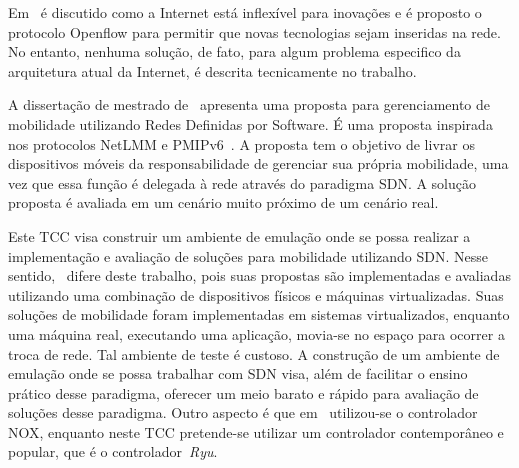 \documentclass[	12pt, Times, openright, twoside, a4paper, english, brazil]{abntex2}
\begin{document}
Em~\cite{McKeown} é discutido como a Internet está inflexível para inovações e é proposto o protocolo Openflow para permitir que novas tecnologias sejam inseridas na rede. No entanto, nenhuma solução, de fato, para algum problema especifico da arquitetura atual da Internet, é descrita tecnicamente no trabalho. 


A dissertação de mestrado de~ apresenta uma proposta para gerenciamento de mobilidade utilizando Redes Definidas por Software. É uma proposta inspirada nos protocolos NetLMM e PMIPv6~\cite{RFC5213}. A proposta tem o objetivo de livrar os dispositivos móveis da responsabilidade de gerenciar sua própria mobilidade, uma vez que essa função é delegada à rede através do paradigma SDN. A solução proposta é avaliada em um cenário muito próximo de um cenário real.

Este TCC visa construir um ambiente de emulação onde se possa realizar a implementação e avaliação de soluções para mobilidade utilizando SDN. Nesse sentido,~ difere deste trabalho, pois suas propostas são implementadas e avaliadas utilizando uma combinação de dispositivos físicos e máquinas virtualizadas. Suas soluções de mobilidade foram implementadas em sistemas virtualizados, enquanto uma máquina real, executando uma aplicação, movia-se no espaço para ocorrer a troca de rede. Tal ambiente de teste é custoso. A construção de um ambiente de emulação onde se possa trabalhar com SDN visa, além de facilitar o ensino prático desse paradigma, oferecer um meio barato e rápido para avaliação de soluções desse paradigma. Outro aspecto é que em~\cite{avelar2013} utilizou-se o controlador NOX, enquanto neste TCC pretende-se utilizar um controlador contemporâneo e popular, que é o controlador~\textit{Ryu}.
\end{document}
